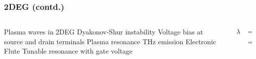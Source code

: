 \documentclass[10pt]{beamer}
\renewcommand{\u}{\mu}  %
\begin{document}
\begin{frame}
    \frametitle{2DEG (contd.)}

    \begin{columns} %
        \begin{column}{.5\textwidth}
            \begin{minipage}[T][.1\textheight][c]{\linewidth}
                \begin{outline}[itemize]
                    \1 Plasma waves in 2DEG
                    \1 Dyakonov-Shur instability
                    \2 Voltage bias at source and drain terminals
                    \2 Plasma resonance
                    \2 THz emission
                    \1 Electronic Flute
                    \2 Tunable resonance with gate voltage
                \end{outline}
            \end{minipage}
        \end{column}
        \begin{column}{.5\textwidth}
            \begin{figure}
                \fontsize{6}{7}\selectfont
                \def\svgwidth{1.1\linewidth}
                
            \end{figure}
            \begin{equation} \nonumber
                \begin{split}
                    \lambda &= \frac{c}{f} \\
                    & \Longrightarrow  300 \u \mathrm{m}
                \end{split}
                \label{eq:disp_TE_two}
            \end{equation}
        \end{column}%
    \end{columns}
\end{frame}
\end{document}
